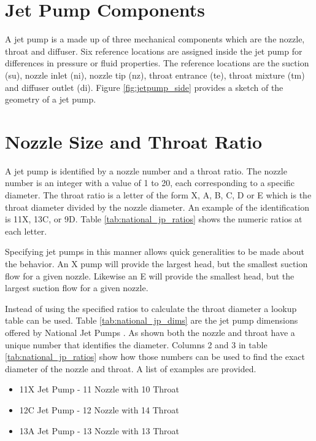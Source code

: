 \documentclass[12 pt]{report}
\begin{document}
\section{Jet Pump Components}

A jet pump is a made up of three mechanical components which are the nozzle, throat and diffuser. Six reference locations are assigned inside the jet pump for differences in pressure or fluid properties. The reference locations are the suction (su), nozzle inlet (ni), nozzle tip (nz), throat entrance (te), throat mixture (tm) and diffuser outlet (di). Figure \ref{fig:jetpump_side} provides a sketch of the geometry of a jet pump. 

\section{Nozzle Size and Throat Ratio}

A jet pump is identified by a nozzle number and a throat ratio. The nozzle number is an integer with a value of 1 to 20, each corresponding to a specific diameter. The throat ratio is a letter of the form X, A, B, C, D or E which is the throat diameter divided by the nozzle diameter. An example of the identification is 11X, 13C, or 9D. Table \ref{tab:national_jp_ratios} shows the numeric ratios at each letter.



Specifying jet pumps in this manner allows quick generalities to be made about the behavior. An X pump will provide the largest head, but the smallest suction flow for a given nozzle. Likewise an E will provide the smallest head, but the largest suction flow for a given nozzle.

Instead of using the specified ratios to calculate the throat diameter a lookup table can be used. Table \ref{tab:national_jp_dims} are the jet pump dimensions offered by National Jet Pumps \cite{petrie}. As shown both the nozzle and throat have a unique number that identifies the diameter. Columns 2 and 3 in table \ref{tab:national_jp_ratios} show how those numbers can be used to find the exact diameter of the nozzle and throat. A list of examples are provided.

\begin{itemize}
    \item 11X Jet Pump - 11 Nozzle with 10 Throat
    \item 12C Jet Pump - 12 Nozzle with 14 Throat
    \item 13A Jet Pump - 13 Nozzle with 13 Throat
\end{itemize}
\end{document}
